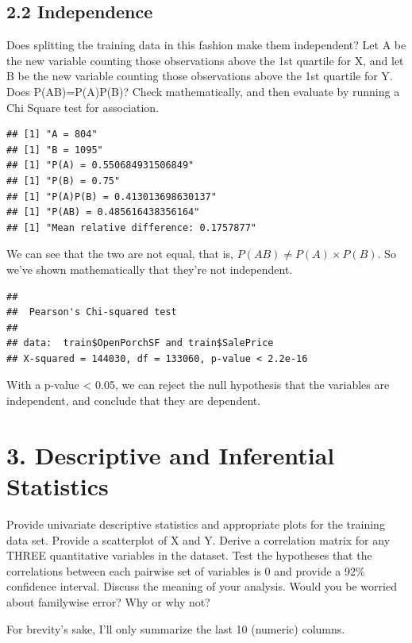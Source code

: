 \documentclass[]{article}
\begin{document}
\hypertarget{independence}{%
\subsection{2.2 Independence}\label{independence}}

Does splitting the training data in this fashion make them independent?
Let A be the new variable counting those observations above the 1st
quartile for X, and let B be the new variable counting those
observations above the 1st quartile for Y. Does P(AB)=P(A)P(B)? Check
mathematically, and then evaluate by running a Chi Square test for
association.

\begin{verbatim}
## [1] "A = 804"
## [1] "B = 1095"
## [1] "P(A) = 0.550684931506849"
## [1] "P(B) = 0.75"
## [1] "P(A)P(B) = 0.413013698630137"
## [1] "P(AB) = 0.485616438356164"
## [1] "Mean relative difference: 0.1757877"
\end{verbatim}

We can see that the two are not equal, that is,
\(P(AB) \neq P(A)\times P(B)\). So we've shown mathematically that
they're not independent.

\begin{verbatim}
## 
##  Pearson's Chi-squared test
## 
## data:  train$OpenPorchSF and train$SalePrice
## X-squared = 144030, df = 133060, p-value < 2.2e-16
\end{verbatim}

With a p-value \textless{} 0.05, we can reject the null hypothesis that
the variables are independent, and conclude that they are dependent.

\hypertarget{descriptive-and-inferential-statistics}{%
\section{3. Descriptive and Inferential
Statistics}\label{descriptive-and-inferential-statistics}}

Provide univariate descriptive statistics and appropriate plots for the
training data set. Provide a scatterplot of X and Y. Derive a
correlation matrix for any THREE quantitative variables in the dataset.
Test the hypotheses that the correlations between each pairwise set of
variables is 0 and provide a 92\% confidence interval. Discuss the
meaning of your analysis. Would you be worried about familywise error?
Why or why not?

For brevity's sake, I'll only summarize the last 10 (numeric) columns.
\end{document}
